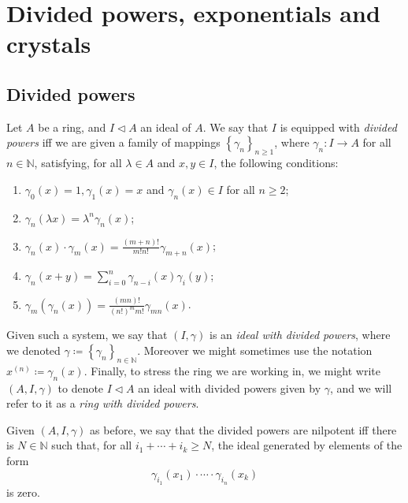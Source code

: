 \documentclass[../Main]{subfiles}
\begin{document}
\section{Divided powers, exponentials and crystals}
\subsection{Divided powers}
\begin{defn}\label{defn:dividedPowers}
	Let $A$ be a ring, and $I \triangleleft A$ an ideal of $A$.
	We say that $I$ is equipped with {\em divided powers} iff
	we are given a family of mappings $\left\{ \gamma_n \right\}_{n \geq 1}$,
	where $\gamma_n\colon I \to A$ for all $n \in \mathbb{N}$,
	satisfying, for all $\lambda \in A$ and $x,y \in I$, the following conditions:
	\begin{enumerate}
		\item $\gamma_0(x) = 1, \gamma_1(x) = x$ and 
			$\gamma_n(x) \in I$ for all $n \geq 2$;
		\item $\gamma_n(\lambda x) = \lambda^n \gamma_n(x)$;
		\item $\gamma_n(x) \cdot \gamma_m(x) =
			\frac{\left( m + n \right)!}{m! n!} \gamma_{m+n}(x)$;
		\item $\gamma_n(x+y) = \sum_{i=0}^{n} \gamma_{n-i}(x) \gamma_i(y)$;
		\item $\gamma_m(\gamma_n(x)) = 
			\frac{\left( mn \right)!}{\left( n! \right)^m m!} \gamma_{mn}(x)$.
	\end{enumerate}
	Given such a system, we say that $(I,\gamma)$
	is an {\em ideal with divided powers},
	where we denoted $\gamma \coloneqq \left\{ \gamma_n \right\}_{n \in \mathbb{N}}$.
	Moreover we might sometimes use the notation
	$x^{(n)} \coloneqq \gamma_n(x)$.
	Finally, to stress the ring we are working in, we might write
	$\left(A, I, \gamma\right)$ to denote $I \triangleleft A$
	an ideal with divided powers given by $\gamma$, and 
	we will refer to it as a {\em ring with divided powers}.
\end{defn}


\begin{defn}\label{defn:NilpotentDividedPowers}
	Given $\left(A, I, \gamma\right)$ as before, we say that the divided
	powers are nilpotent iff there is $N \in \mathbb{N}$ such that,
	for all $i_1 + \cdots + i_k \geq N$,
	the ideal generated by elements of the form
	\begin{equation*}
		\gamma_{i_1}(x_1) \cdot \cdots \cdot \gamma_{i_n}(x_k)
	\end{equation*}
	is zero.
\end{defn}
\end{document}
